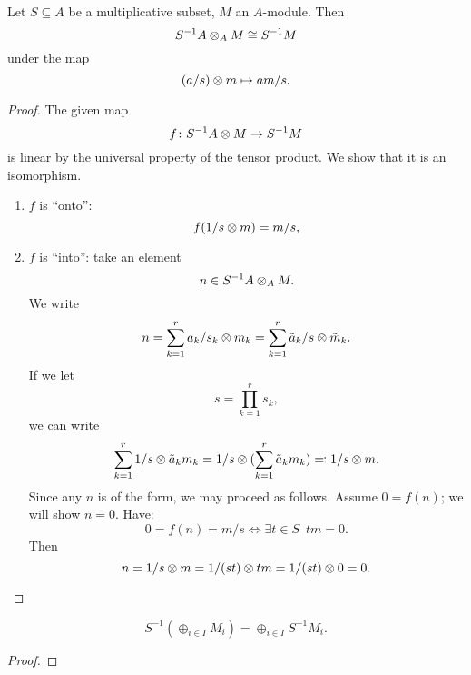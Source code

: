 \begin{lemma}
  Let $S \subseteq A$ be a multiplicative subset, $M$ an $A$-module. Then
  \[ S^{-1}A \otimes_A M \cong S^{-1}M\]
  under the map
  \[ (a / {s}) \otimes m \mapsto am /{s}.\]
\end{lemma}
\begin{proof}
  The given map
  \[ f \colon S^{-1}A \otimes M \to S^{-1} M\]
  is linear by the universal property of the tensor product. We show that it is an isomorphism.
  \begin{enumerate}
  \item $f$ is ``onto'':
    \[ f(1/{s} \otimes m) = m /{s},\]
  \item $f$ is ``into'': take an element
    \[ n \in S^{-1}A \otimes_A M.\]
    We write
    \[ n = \sum_{k=1}^r a_k/{s_k} \otimes m_k = \sum_{k=1}^r \tilde{a}_k / {s} \otimes \tilde{m}_k.\]
    If we let
    \[s = \prod_{k=1}^r s_k,\]
    we can write
    \[ \sum_{k=1}^r 1 /{s} \otimes \tilde{a}_k m_k = 1 /{s} \otimes (\sum_{k=1}^r \tilde{a}_k m_k) \eqqcolon 1 / {s} \otimes m.\]
    Since any $n$ is of the form, we may proceed as follows. Assume
    $0 = f(n)$;
    we will show
    $n = 0$.
    Have:
    \[ 0 = f(n) = m /{s} \iff \exists t \in S \enspace tm = 0.\]
    Then
    \[ n = 1/ {s} \otimes m = 1 / {(st)} \otimes tm = 1 /{(st)} \otimes 0 = 0.\]
  \end{enumerate}
\end{proof}

\begin{corollary}
  \[S^{-1}( \oplus_{i \in I} M_i) = \oplus_{i \in I} S^{-1} M_i.\]
\end{corollary}
\begin{proof}
\end{proof}


